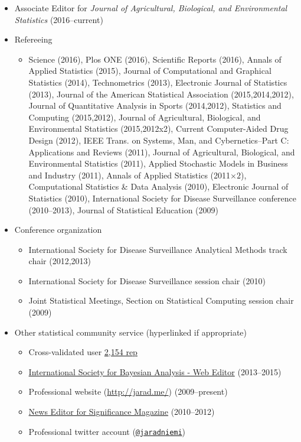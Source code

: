 \documentclass[overlapped,line]{res}
\begin{document}
\begin{resume}
\begin{itemize}
\item Associate Editor for \emph{Journal of Agricultural, Biological, and Environmental Statistics} (2016--current)
\item Refereeing
 \begin{itemize}
 \item Science (2016), 
 Plos ONE (2016), 
 Scientific Reports (2016), 
 Annals of Applied Statistics (2015), 
 Journal of Computational and Graphical Statistics (2014), 
 Technometrics (2013), 
 Electronic Journal of Statistics (2013), 
 Journal of the American Statistical Association (2015,2014,2012), 
 Journal of Quantitative Analysis in Sports (2014,2012), 
 Statistics and Computing (2015,2012), 
 Journal of Agricultural, Biological, and Environmental Statistics (2015,2012x2), 
 Current Computer-Aided Drug Design (2012), 
 IEEE Trans. on Systems, Man, and Cybernetics--Part C: Applications and Reviews (2011), 
 Journal of Agricultural, Biological, and Environmental Statistics (2011), 
 Applied Stochastic Models in Business and Industry (2011), 
 Annals of Applied Statistics  (2011$\times 2$), 
 Computational Statistics \& Data Analysis (2010), 
 Electronic Journal of Statistics (2010), 
 International Society for Disease Surveillance conference (2010--2013), 
 Journal of Statistical Education (2009)
 \end{itemize}
 
 

 
\item Conference organization
 \begin{itemize}
 \item International Society for Disease Surveillance Analytical Methods track chair (2012,2013)
 \item International Society for Disease Surveillance session chair (2010)
 \item Joint Statistical Meetings, Section on Statistical Computing session chair (2009)
 \end{itemize}
\item Other statistical community service (hyperlinked if appropriate)
 \begin{itemize}
 \item Cross-validated user \href{http://stats.stackexchange.com/users/40440/jaradniemi}{2,154 rep}
 \item \href{http://bayesian.org/}{International Society for Bayesian Analysis -  Web Editor} (2013--2015)
 \item Professional website (\url{http://jarad.me/}) (2009--present)
 \item \href{http://www.significancemagazine.org/view/searchResults.html?s=&t=&q=jarad+niemi}{News Editor for Significance Magazine} (2010--2012)
 \item Professional twitter account ({\tt \href{https://twitter.com/jaradniemi}{@jaradniemi}})
 \end{itemize}


\end{itemize}
\end{resume}
\end{document}
